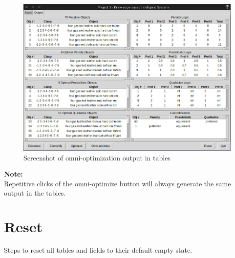 \documentclass[12pt]{report}
\begin{document}
\begin{description}[leftmargin=4em]
\begin{figure}[H]
\begin{center}
\includegraphics[scale=0.3,trim=1cm 1cm 1cm 1cm]{post_omni-optimize}
\caption{Screenshot of omni-optimization output in tables}
\end{center}
\end{figure}
\vspace{-2.5em}
\end{description}

\textbf{Note:} \\
Repetitive clicks of the omni-optimize button will always generate the same output in the tables.

\newpage
\chapter{Reset}
Steps to reset all tables and fields to their default empty state.\\
\end{document}
